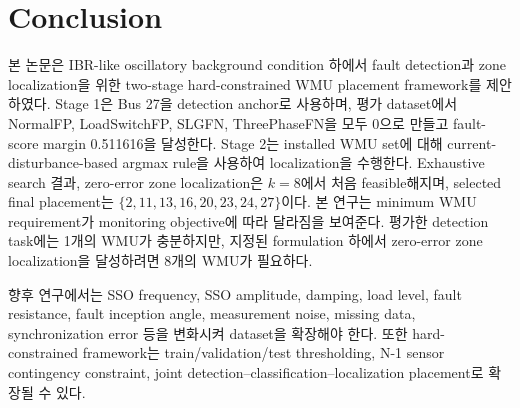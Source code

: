 \documentclass[conference]{IEEEtran}
\begin{document}
\section{Conclusion}

본 논문은 IBR-like oscillatory background condition 하에서 fault detection과 zone localization을 위한 two-stage hard-constrained WMU placement framework를 제안하였다. Stage 1은 Bus 27을 detection anchor로 사용하며, 평가 dataset에서 NormalFP, LoadSwitchFP, SLGFN, ThreePhaseFN을 모두 0으로 만들고 fault-score margin 0.511616을 달성한다. Stage 2는 installed WMU set에 대해 current-disturbance-based argmax rule을 사용하여 localization을 수행한다. Exhaustive search 결과, zero-error zone localization은 $k=8$에서 처음 feasible해지며, selected final placement는 $\{2,11,13,16,20,23,24,27\}$이다. 본 연구는 minimum WMU requirement가 monitoring objective에 따라 달라짐을 보여준다. 평가한 detection task에는 1개의 WMU가 충분하지만, 지정된 formulation 하에서 zero-error zone localization을 달성하려면 8개의 WMU가 필요하다.

향후 연구에서는 SSO frequency, SSO amplitude, damping, load level, fault resistance, fault inception angle, measurement noise, missing data, synchronization error 등을 변화시켜 dataset을 확장해야 한다. 또한 hard-constrained framework는 train/validation/test thresholding, N-1 sensor contingency constraint, joint detection--classification--localization placement로 확장될 수 있다.



\end{document}
